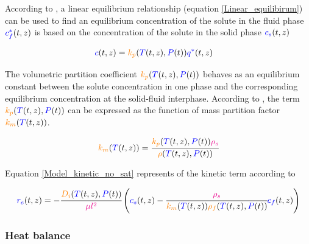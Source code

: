 \documentclass[../Article_Model_Parameters.tex]{subfiles}
\begin{document}
		According to \citet{Bulley1984}, a linear equilibrium relationship (equation  \ref{Linear_equilibirum}) can be used to find an equilibrium concentration of the solute in the fluid phase ${\color{blue}c_f^*}(t,z)$ is based on the concentration of the solute in the solid phase ${\color{blue}c_s}(t,z)$ 
			
			{\footnotesize
				\begin{align} \label{Linear_equilibirum}
					{\color{blue}c}(t,z) &= {\color{orange}k_p}({\color{blue}T}(t,z),{\color{blue}P}(t)) \allowbreak {\color{blue}q^*}(t,z)
			\end{align} }
			
			The volumetric partition coefficient ${\color{orange}k_p}({\color{blue}T}(t,z),{\color{blue}P}(t))$ behaves as an equilibrium constant between the solute concentration in one phase and the corresponding equilibrium concentration at the solid-fluid interphase. According to \citet{Spiro2007}, the term ${\color{orange}k_p}({\color{blue}T}(t,z),{\color{blue}P}(t))$ can be expressed as the function of mass partition factor ${\color{orange}k_m}({\color{blue}T}(t,z))$.
			
			{\footnotesize
				\begin{align}
					{\color{orange}k_m}({\color{blue}T}(t,z)) = \cfrac{{\color{orange}k_p}({\color{blue}T}(t,z),{\color{blue}P}(t)) {\color{magenta}\rho_s}}{{\color{orange}\rho}({\color{blue}T}(t,z),{\color{blue}P}(t))}
			\end{align} }
			
			Equation \ref{Model_kinetic_no_sat} represents of the kinetic term according to \citet{Reverchon1996}
			
			{\footnotesize
				\begin{equation}
					\label{Model_kinetic_no_sat}
					{\color{blue}r_e}(t,z) = -\cfrac{{\color{orange}D_i}({\color{blue}T}(t,z), {\color{blue}P}(t))}{{\color{magenta} \mu l^2} }\left({\color{blue}c_s}(t,z) - \cfrac{{\color{magenta}\rho_s}}{{\color{orange}k_m}({\color{blue}T}(t,z)){\color{orange}\rho_f}({\color{blue}T}(t,z),{\color{blue}P}(t))}  {\color{blue}c_f}(t,z) \right)
			\end{equation} }

        
			
		\subsubsection{Heat balance} \label{CH: heat_balance}
		
\end{document}
